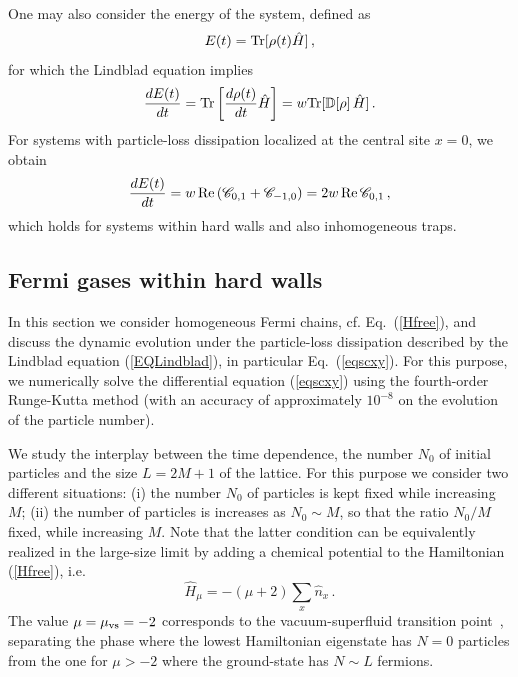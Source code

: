   One may also consider the energy of the system, defined as
  \begin{eqnarray}
  E(t) = {\rm Tr}[\rho(t) \hat H] \,,
  \label{enedef}
  \end{eqnarray}
  for which the Lindblad equation implies
  \begin{eqnarray}
    {d E(t)\over dt} = {\rm Tr}\left[{d\rho(t)\over dt} \hat H\right]= w
    {\rm Tr}[{\mathbb D}[\rho] \,\hat H]\,.
    \label{detg}
  \end{eqnarray}
  For systems with particle-loss dissipation localized at the central
  site $x=0$, we obtain
  \begin{eqnarray}
    {d E(t)\over dt} =
    w \, {\rm Re}\,({\mathscr C}_{0,1}+{\mathscr C}_{-1,0}) =
    2 w \, {\rm Re}\,{\mathscr C}_{0,1}\,,
    \label{derene}
  \end{eqnarray}
  which holds for systems within hard walls and also inhomogeneous
  traps.
  
  \subsection{Fermi gases within hard walls}
  \label{hwbc}
  
  In this section we consider homogeneous Fermi chains, cf.
  Eq.~(\ref{Hfree}), and discuss the dynamic evolution under the
  particle-loss dissipation described by the Lindblad equation
  (\ref{EQLindblad}), in particular Eq.~(\ref{eqscxy}). For this
  purpose, we numerically solve the differential equation (\ref{eqscxy})
  using the fourth-order Runge-Kutta method (with an accuracy of
  approximately $10^{-8}$ on the evolution of the particle number).
  
  We study the interplay between the time dependence, the number $N_0$
  of initial particles and the size $L=2M+1$ of the lattice.  For this
  purpose we consider two different situations: (i) the number $N_0$ of
  particles is kept fixed while increasing $M$; (ii) the number of
  particles is increases as $N_0\sim M$, so that the ratio $N_0/M$
  fixed, while increasing $M$. Note that the latter condition can be
  equivalently realized in the large-size limit by adding a chemical
  potential to the Hamiltonian (\ref{Hfree}), i.e.
  \begin{equation}
  \hat H_\mu = -(\mu+2) \sum _x \hat n_x \,.
  \label{chemicalpot}
  \end{equation}
  The value $\mu=\mu_{\rm vs}=-2$ corresponds to the vacuum-superfluid
  transition point~\cite{S99,ACV-14}, separating the phase
  where the lowest Hamiltonian eigenstate has $N=0$ particles from the
  one for $\mu>-2$ where the ground-state has $N\sim L$ fermions.
  
